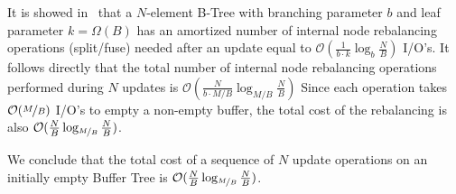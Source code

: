 \documentclass[twoside,11pt,openright]{report}
\begin{document}
It is showed in~\cite{ionote} that a $N$-element B-Tree with branching parameter $b$ and leaf parameter $k = \Omega(B)$ has an amortized number of internal node rebalancing operations (split/fuse) needed after an update equal to $\mathcal{O}(\frac{1}{b \cdot k}\log_b \frac{N}{B})$ I/O's. It follows directly that the total number of internal node rebalancing operations performed during $N$ updates is $\mathcal{O}(\frac{N}{b \cdot M/B}\log_{M/B} \frac{N}{B})$ Since each operation takes $\mathcal{O}(\nicefrac{M}{B})$ I/O's to empty a non-empty buffer, the total cost of the rebalancing is also $\mathcal{O}(\frac{N}{B} \log_{\nicefrac{M}{B}} \frac{N}{B})$.

We conclude that the total cost of a sequence of $N$ update operations on an initially empty Buffer Tree is $\mathcal{O}(\frac{N}{B} \log_{\nicefrac{M}{B}} \frac{N}{B})$.



\end{document}
